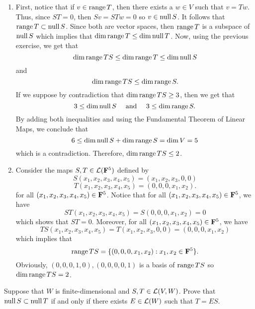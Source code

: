 \begin{solution}
    \begin{enumerate}[label=(\alph*)]
        \item First, notice that if $v \in \operatorname{\text{range}} T$, then there exists a $w \in V$ such that $v = Tw$. Thus, since $ST = 0$, then $Sv = STw = 0$ so $v \in \operatorname{\text{null}} S$. It follows that $\operatorname{\text{range}} T \subset \operatorname{\text{null}} S$. Since both are vector spaces, then $\operatorname{\text{range}} T$ is a subspace of $\operatorname{\text{null}} S$ which implies that $\dim \operatorname{\text{range}} T \leq \dim \operatorname{\text{null}} T$. Now, using the previous exercise, we get that
        $$\dim \operatorname{\text{range}} TS \leq \dim \operatorname{\text{range}} T \leq \dim \operatorname{\text{null}} S$$
        and
        $$\dim \operatorname{\text{range}} TS \leq \dim \operatorname{\text{range}} S.$$
        If we suppose by contradiction that $\dim \operatorname{\text{range}} TS \geq 3$, then we get that
        $$3 \leq \dim \operatorname{\text{null}} S \quad \text{ and } \quad 3\leq  \dim \operatorname{\text{range}} S.$$
        By adding both inequalities and using the Fundamental Theorem of Linear Maps, we conclude that
        $$6 \leq \dim \operatorname{\text{null}} S + \dim \operatorname{\text{range}} S = \dim V = 5$$
        which is a contradiction. Therefore, $\dim \operatorname{\text{range}} TS \leq 2$.
        \item Consider the maps $S,T \in \mathcal{L}(\mathbf{F}^5)$ defined by
        $$S(x_1, x_2, x_3, x_4, x_5) = (x_1, x_2, x_3, 0, 0)$$
        $$T(x_1, x_2, x_3, x_4, x_5) = (0, 0, 0, x_1, x_2).$$
        for all $(x_1, x_2, x_3, x_4, x_5) \in \mathbf{F}^5$. Notice that for all $(x_1, x_2, x_3, x_4, x_5) \in \mathbf{F}^5$, we have
        $$ST(x_1, x_2, x_3, x_4, x_5) = S(0, 0, 0, x_1, x_2) = 0$$
        which shows that $ST = 0$. Moreover, for all $(x_1, x_2, x_3, x_4, x_5) \in \mathbf{F}^5$, we have 
        $$TS(x_1, x_2, x_3, x_4, x_5) = T(x_1, x_2, x_3, 0, 0) = (0, 0, 0, x_1, x_2)$$
        which implies that
        $$\operatorname{\text{range}} TS = \{(0, 0, 0, x_1, x_2) : x_1, x_2\in \mathbf{F}^5\}.$$
        Obviously, $(0, 0, 0, 1, 0), (0, 0, 0, 0, 1)$ is a basis of $\operatorname{\text{range}} TS$ so $\dim \operatorname{\text{range}} TS = 2$. \\
    \end{enumerate}
\end{solution}

\begin{exercise}
    Suppose that $W$ is finite-dimensional and $S,T \in \mathcal{L}(V,W)$. Prove that $\operatorname{\text{null}} S \subset \operatorname{\text{null}} T$ if and only if there exists $E \in \mathcal{L}(W)$ such that $T = ES$. \\
\end{exercise}

